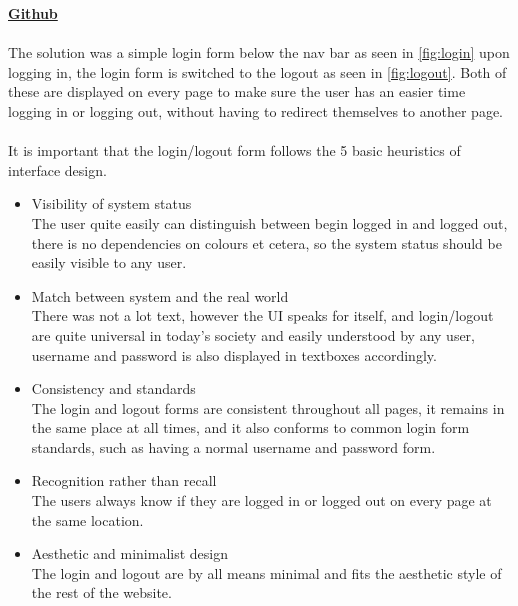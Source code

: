 \documentclass[a4paper]{scrartcl}
\begin{document}
\textbf{\href{https://github.com/linus-dev/KTH-Projects/tree/master/ID1354/2}{Github}}\\\\

\noindent
The solution was a simple login form below the nav bar as
seen in \ref{fig:login} upon logging in, the login form is
switched to the logout as seen in \ref{fig:logout}. Both
of these are displayed on every page to make sure the
user has an easier time logging in or logging out, without
having to redirect themselves to another page.
\\\\
It is important that the login/logout form follows the 5 basic heuristics of
interface design.
\begin{itemize}
\item{Visibility of system status}\\
  The user quite easily can distinguish between begin logged in and logged out,
  there is no dependencies on colours et cetera, so the system status should be
  easily visible to any user.
\item{Match between system and the real world}\\
  There was not a lot text, however the UI speaks for itself, and login/logout
  are quite universal in today's society and easily understood by any user, username and password is also displayed in
  textboxes accordingly.
\item{Consistency and standards}\\
  The login and logout forms are consistent throughout all pages, it remains in
  the same place at all times, and it also conforms to common login form standards,
  such as having a normal username and password form.
\item{Recognition rather than recall}\\
  The users always know if they are logged in or logged out on every page at the same
  location.
\item{Aesthetic and minimalist design}\\
  The login and logout are by all means minimal and fits the aesthetic style of the rest of the website.
\end{itemize}
\end{document}

